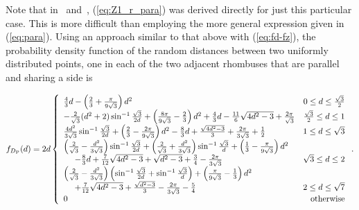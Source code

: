 \documentclass[12pt,draftclsnofoot,onecolumn]{IEEEtran}
\begin{document}
Note that in~\cite{zhuang2011random}
and~\cite{zhuang2012geometrical}, (\ref{eq:Z1_r_para}) was derived directly for just this particular case.
This is more difficult than employing the more general expression given in (\ref{eq:para}).
Using an approach similar to that above with (\ref{eq:fd-fz}), the probability density
function of the random distances between two uniformly distributed points, one
in each of the two adjacent rhombuses that are parallel and sharing a side is
\begin{small}
 \begin{equation}\label{eq:fd_r_para}
  f_{D_{\rm P}}(d)=2d\left\{
    \begin{array}{lr}

\frac{4}{3}d-\left(\frac{2}{3}+\frac{\pi}{9\sqrt{3}}\right)d^2 & 0\leq d\leq
\frac{\sqrt{3}}{2}\\

-\frac{2}{\sqrt{3}}(d^2+2)\sin^{-1}\frac{\sqrt{3}}{2d}+\left(\frac{8\pi}
{9\sqrt{3}}-\frac{2}{3}\right)d^2+\frac{4}{3}d-\frac{11}{6}\sqrt{4d^2-3}+\frac{
2\pi}{\sqrt{3}} & \frac{\sqrt{3}}{2}\leq d\leq 1\\

\frac{4d^2}{3\sqrt{3}}\sin^{-1}\frac{\sqrt{3}}{2d}+\left(\frac{2}{3}
-\frac{2\pi}{9\sqrt{3}}\right)d^2-\frac{8}{3}d+\frac{\sqrt{4d^2-3}}{3}+\frac{
2\pi}{3\sqrt{3}}+\frac{1}{2} & 1\leq d\leq \sqrt{3} \\

\left(\frac{2}{\sqrt{3}}-\frac{d^2}{3\sqrt{3}}\right)\sin^{-1}\frac{\sqrt
{3}}{2d}+\left(\frac{2}{\sqrt{3}}+\frac{d^2}{3\sqrt{3}}\right)\sin^{-1}\frac{
\sqrt{3}}{d}+\left(\frac{1}{3}-\frac{\pi}{9\sqrt{3}}\right)d^2 \\
~~~~-\frac{8}{3}d+\frac{7}{12}\sqrt{4d^2-3}+\sqrt{d^2-3}+\frac{3}{4}
-\frac{2\pi}{3\sqrt{3}} & \sqrt{3}\leq d\leq 2 \\

\left(\frac{2}{\sqrt{3}}-\frac{d^2}{3\sqrt{3}}\right)\left(\sin^{-1}\frac{
\sqrt{3}}{2d}+\sin^{-1}\frac{\sqrt{3}}{d}\right)+\left(\frac{\pi}{9\sqrt{3}}
-\frac{1}{3 }\right)d^2 \\
~~~~+\frac{7}{12}\sqrt{4d^2-3}+\frac{\sqrt{d^2-3}}{3}-\frac{2\pi}{3\sqrt{3}}
-\frac{5}{4} & 2 \leq d \leq \sqrt{7} \\

      0 & {\rm otherwise}
    \end{array}
 \right..
\end{equation}
\end{small}
\end{document}
